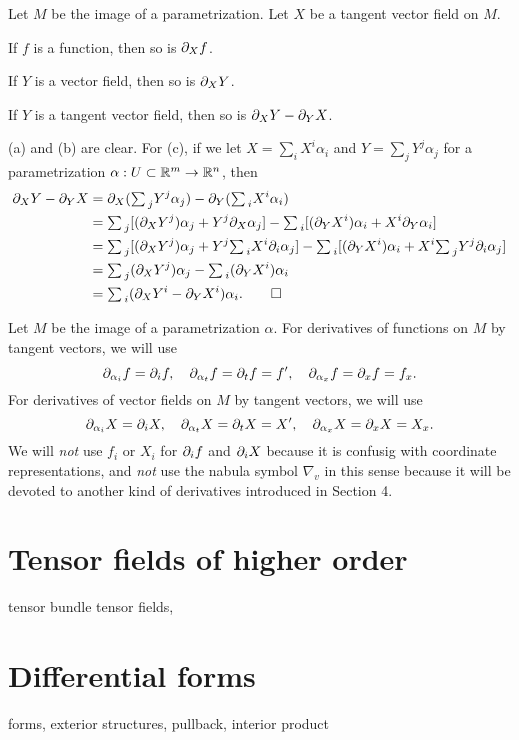\documentclass{../../large}
\renewcommand{\a}{\alpha}
\newcommand{\ssum}{{\textstyle\sum\,}}
\begin{document}
\begin{prb}
Let $M$ be the image of a parametrization.
Let $X$ be a tangent vector field on $M$.
\begin{parts}
\item If $f$ is a function, then so is $\pd_Xf$.
\item If $Y$ is a vector field, then so is $\pd_XY$.
\item If $Y$ is a tangent vector field, then so is $\pd_XY-\pd_YX$.
\end{parts}
\end{prb}
\begin{pf}
(a) and (b) are clear.
For (c), if we let $X=\sum_iX^i\a_i$ and $Y=\sum_jY^j\a_j$ for a parametrization $\a:U\subset\R^m\to\R^n$, then
\begin{align*}
\pd_XY-\pd_YX
&=\pd_X(\ssum_jY^j\a_j)-\pd_Y(\ssum_iX^i\a_i)\\
&=\ssum_j[(\pd_XY^j)\a_j+Y^j\pd_X\a_j]-\ssum_i[(\pd_YX^i)\a_i+X^i\pd_Y\a_i]\\
&=\ssum_j[(\pd_XY^j)\a_j+Y^j\ssum_iX^i\pd_i\a_j]-\ssum_i[(\pd_YX^i)\a_i+X^i\ssum_jY^j\pd_i\a_j]\\
&=\ssum_j(\pd_XY^j)\a_j-\ssum_i(\pd_YX^i)\a_i\\
&=\ssum_i(\pd_XY^i-\pd_YX^i)\a_i.\qedhere
\end{align*}
\end{pf}

\begin{prb}
Let $M$ be the image of a parametrization $\a$.
For derivatives of functions on $M$ by tangent vectors, we will use
\[\pd_{\a_i}f=\pd_if,\quad\pd_{\a_t}f=\pd_tf=f',\quad\pd_{\a_x}f=\pd_xf=f_x.\]
For derivatives of vector fields on $M$ by tangent vectors, we will use
\[\pd_{\a_i}X=\pd_iX,\quad\pd_{\a_t}X=\pd_tX=X',\quad\pd_{\a_x}X=\pd_xX=X_x.\]
We will \emph{not} use $f_i$ or $X_i$ for $\pd_if$ and $\pd_iX$ because it is confusig with coordinate representations, and \emph{not} use the nabula symbol $\nabla_v$ in this sense because it will be devoted to another kind of derivatives introduced in Section 4.
\end{prb}

\section{Tensor fields of higher order}
tensor bundle
tensor fields,

\section{Differential forms}
forms, exterior structures, pullback, interior product
\end{document}
